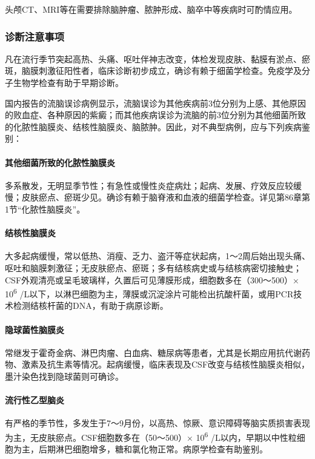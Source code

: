 头颅CT、MRI等在需要排除脑肿瘤、脓肿形成、脑卒中等疾病时可酌情应用。

\subsubsection{诊断注意事项}

凡在流行季节突起高热、头痛、呕吐伴神志改变，体检发现皮肤、黏膜有淤点、瘀斑，脑膜刺激征阳性者，临床诊断初步成立，确诊有赖于细菌学检查。免疫学及分子生物学检查有助于早期诊断。

国内报告的流脑误诊病例显示，流脑误诊为其他疾病前3位分别为上感、其他原因的败血症、各种原因的紫癜；而其他疾病误诊为流脑的前3位分别为其他细菌所致的化脓性脑膜炎、结核性脑膜炎、脑脓肿。因此，对不典型病例，应与下列疾病鉴别：

\paragraph{其他细菌所致的化脓性脑膜炎}

多系散发，无明显季节性；有急性或慢性炎症病灶；起病、发展、疗效反应较缓慢；皮肤瘀点、瘀斑少见。确诊有赖于脑脊液和血液的细菌学检查。详见第86章第1节“化脓性脑膜炎”。

\paragraph{结核性脑膜炎}

大多起病缓慢，常以低热、消瘦、乏力、盗汗等症状起病，1～2周后始出现头痛、呕吐和脑膜刺激征；无皮肤瘀点、瘀斑；多有结核病史或与结核病密切接触史；CSF外观清亮或呈毛玻璃样，久置后可见薄膜形成，细胞数多在（300～500）×
10\textsuperscript{6}
/L以下，以淋巴细胞为主，薄膜或沉淀涂片可能检出抗酸杆菌，或用PCR技术检测结核杆菌的DNA，有助于病原诊断。

\paragraph{隐球菌性脑膜炎}

常继发于霍奇金病、淋巴肉瘤、白血病、糖尿病等患者，尤其是长期应用抗代谢药物、激素及抗生素等情况。起病缓慢，临床表现及CSF改变与结核性脑膜炎相似，墨汁染色找到隐球菌则可确诊。

\paragraph{流行性乙型脑炎}

有严格的季节性，多发生于7～9月份，以高热、惊厥、意识障碍等脑实质损害表现为主，无皮肤瘀点。CSF细胞数多在（50～500）×
10\textsuperscript{6}
/L以内，早期以中性粒细胞为主，后期淋巴细胞增多，糖和氯化物正常。病原学检查有助鉴别。

